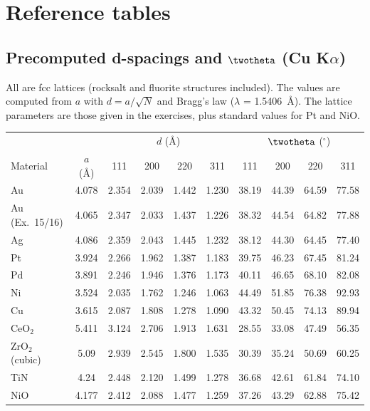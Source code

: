 \chapter{Reference tables}
\label{app:tables}

\section{Precomputed d-spacings and $\twotheta$ (Cu K$\alpha$)}
\label{app:dspacings}
All are fcc lattices (rocksalt and fluorite structures included). The values are computed from $a$ with
$d = a/\sqrt N$ and Bragg's law ($\lambda$ = \SI{1.5406}{\angstrom})\extra. The lattice parameters are those given in the
exercises, plus standard values for Pt and NiO.
\begin{center}
\small
\renewcommand{\arraystretch}{1.2}
\begin{tabular}{@{}lc|cccc|cccc@{}}
\toprule
 & & \multicolumn{4}{c|}{$d$ (\AA)} & \multicolumn{4}{c}{$\twotheta$ ($^\circ$)} \\
Material & $a$ (\AA) & 111 & 200 & 220 & 311 & 111 & 200 & 220 & 311 \\ \midrule
Au & 4.078 & 2.354 & 2.039 & 1.442 & 1.230 & 38.19 & 44.39 & 64.59 & 77.58 \\
Au (Ex.\ 15/16) & 4.065 & 2.347 & 2.033 & 1.437 & 1.226 & 38.32 & 44.54 & 64.82 & 77.88 \\
Ag & 4.086 & 2.359 & 2.043 & 1.445 & 1.232 & 38.12 & 44.30 & 64.45 & 77.40 \\
Pt & 3.924 & 2.266 & 1.962 & 1.387 & 1.183 & 39.75 & 46.23 & 67.45 & 81.24 \\
Pd & 3.891 & 2.246 & 1.946 & 1.376 & 1.173 & 40.11 & 46.65 & 68.10 & 82.08 \\
Ni & 3.524 & 2.035 & 1.762 & 1.246 & 1.063 & 44.49 & 51.85 & 76.38 & 92.93 \\
Cu & 3.615 & 2.087 & 1.808 & 1.278 & 1.090 & 43.32 & 50.45 & 74.13 & 89.94 \\
CeO$_2$ & 5.411 & 3.124 & 2.706 & 1.913 & 1.631 & 28.55 & 33.08 & 47.49 & 56.35 \\
ZrO$_2$ (cubic) & 5.09 & 2.939 & 2.545 & 1.800 & 1.535 & 30.39 & 35.24 & 50.69 & 60.25 \\
TiN & 4.24 & 2.448 & 2.120 & 1.499 & 1.278 & 36.68 & 42.61 & 61.84 & 74.10 \\
NiO & 4.177 & 2.412 & 2.088 & 1.477 & 1.259 & 37.26 & 43.29 & 62.88 & 75.42 \\
\bottomrule
\end{tabular}
\end{center}

